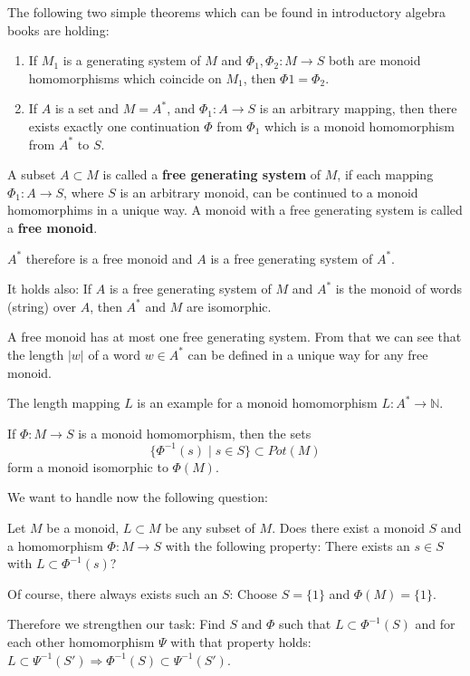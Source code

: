 The following two simple theorems which can be found in introductory algebra
books are holding:
\begin{enumerate}
  \item If $M_1$ is a generating system of $M$ and $\Phi_1, \Phi_2 : M \to S$
  both are monoid homomorphisms which coincide on $M_1$, then $\Phi1 = \Phi_2$.
  \item If $A$ is a set and $M = A^*$, and $\Phi_1 : A \to S$ is an arbitrary
  mapping, then there exists exactly one continuation $\Phi$ from $\Phi_1$ which
  is a monoid homomorphism from $A^*$ to $S$.
\end{enumerate}

\begin{definition}
A subset $A \subset M$ is called a {\bf free generating system} of $M$, if each
mapping $\Phi_1 : A \to S$, where $S$ is an arbitrary monoid, can be continued
to a monoid homomorphims in a unique way. A monoid with a free generating system
is called a {\bf free monoid}.
\end{definition}

$A^*$ therefore is a free monoid and $A$ is a free generating system of $A^*$.

It holds also: If $A$ is a free generating system of $M$ and $A^*$ is the monoid
of words (string) over $A$, then $A^*$ and $M$ are isomorphic.

A free monoid has at most one free generating system. From that we can see that
the length $|w|$ of a word $w \in A^*$ can be defined in a unique way for any
free monoid.

The length mapping $L$ is an example for a monoid homomorphism $L : A^* \to
\mathbb{N}$.

If $\Phi : M \to S$ is a monoid homomorphism, then the sets 
\[\{ \Phi^{-1}(s) \mid s \in S \} \subset Pot(M)\]
form a monoid isomorphic to $\Phi(M)$.

We want to handle now the following question:

Let $M$ be a monoid, $L \subset M$ be any subset of $M$. Does there exist a
monoid $S$ and a homomorphism $\Phi : M \to S$ with the following property:
There exists an $s \in S$ with $L \subset \Phi^{-1}(s)$?

Of course, there always exists such an $S$: Choose $S = \{1\}$ and $\Phi(M) =
\{1\}$.

Therefore we strengthen our task: Find $S$ and $\Phi$ such that $L \subset
\Phi^{-1}(S)$ and for each other homomorphism $\Psi$ with that property holds:
$L \subset \Psi^{-1}(S') \Rightarrow \Phi^{-1}(S) \subset \Psi^{-1}(S')$.

